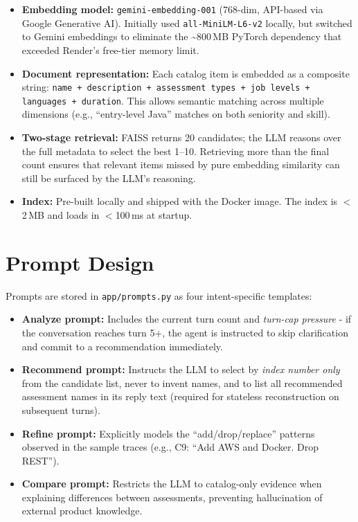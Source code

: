 \documentclass[11pt, a4paper]{article}
\begin{document}
\begin{itemize}[leftmargin=1.5em, nosep]
    \item \textbf{Embedding model:} \texttt{gemini-embedding-001} (768-dim, API-based via Google Generative AI). Initially used \texttt{all-MiniLM-L6-v2} locally, but switched to Gemini embeddings to eliminate the \textasciitilde800\,MB PyTorch dependency that exceeded Render's free-tier memory limit.
    \item \textbf{Document representation:} Each catalog item is embedded as a composite string: \texttt{name + description + assessment types + job levels + languages + duration}. This allows semantic matching across multiple dimensions (e.g., ``entry-level Java'' matches on both seniority and skill).
    \item \textbf{Two-stage retrieval:} FAISS returns 20 candidates; the LLM reasons over the full metadata to select the best 1--10. Retrieving more than the final count ensures that relevant items missed by pure embedding similarity can still be surfaced by the LLM's reasoning.
    \item \textbf{Index:} Pre-built locally and shipped with the Docker image. The index is $<$2\,MB and loads in $<$100\,ms at startup.
\end{itemize}

\section{Prompt Design}

Prompts are stored in \texttt{app/\allowbreak prompts.py} as four intent-specific templates:

\begin{itemize}[leftmargin=1.5em, nosep]
    \item \textbf{Analyze prompt:} Includes the current turn count and \emph{turn-cap pressure} - if the conversation reaches turn 5+, the agent is instructed to skip clarification and commit to a recommendation immediately.
    \item \textbf{Recommend prompt:} Instructs the LLM to select by \emph{index number only} from the candidate list, never to invent names, and to list all recommended assessment names in its reply text (required for stateless reconstruction on subsequent turns).
    \item \textbf{Refine prompt:} Explicitly models the ``add/drop/replace'' patterns observed in the sample traces (e.g., C9: ``Add AWS and Docker. Drop REST'').
    \item \textbf{Compare prompt:} Restricts the LLM to catalog-only evidence when explaining differences between assessments, preventing hallucination of external product knowledge.
\end{itemize}
\end{document}
